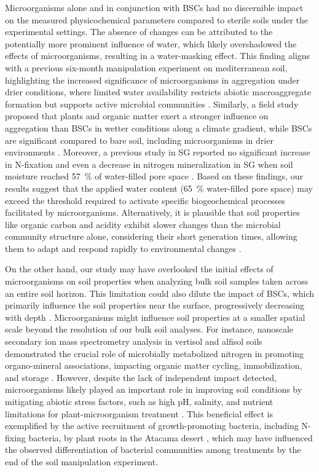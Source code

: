 Microorganisms alone and in conjunction with BSCs had no discernible impact on the measured physicochemical parameters compared to sterile soils under the experimental settings. The absence of changes can be attributed to the potentially more prominent influence of water, which likely overshadowed the effects of microorganisms, resulting in a water-masking effect. This finding aligns with a previous six-month manipulation experiment on mediterranean soil, highlighting the increased significance of microorganisms in aggregation under drier conditions, where limited water availability restricts abiotic macroaggregate formation but supports active microbial communities \citep{Blankinship2016}. Similarly, a field study proposed that plants and organic matter exert a stronger influence on aggregation than BSCs in wetter conditions along a climate gradient, while BSCs are significant compared to bare soil, including microorganisms in drier environments \citep{RiverasMunoz2022}. Moreover, a previous study in SG reported no significant increase in N-fixation and even a decrease in nitrogen mineralization in SG when soil moisture reached \SI{57}{\percent} of water-filled pore space \citep{Seuss2022}. Based on these findings, our results suggest that the applied water content (\SI{65}{\percent} water-filled pore space) may exceed the threshold required to activate specific biogeochemical processes facilitated by microorganisms. Alternatively, it is plausible that soil properties like organic carbon and acidity exhibit slower changes than the microbial community structure alone, considering their short generation times, allowing them to adapt and respond rapidly to environmental changes \citep{Placella2012}.

On the other hand, our study may have overlooked the initial effects of microorganisms on soil properties when analyzing bulk soil samples taken across an entire soil horizon. This limitation could also dilute the impact of BSCs, which primarily influence the soil properties near the surface, progressively decreasing with depth \citep{Miralles2020}. Microorganisms might influence soil properties at a smaller spatial scale beyond the resolution of our bulk soil analyses. For instance, nanoscale secondary ion mass spectrometry analysis in vertisol and alfisol soils demonstrated the crucial role of microbially metabolized nitrogen in promoting organo-mineral associations, impacting organic matter cycling, immobilization, and storage \citep{Kopittke2018}. However, despite the lack of independent impact detected, microorganisms likely played an important role in improving soil conditions by mitigating abiotic stress factors, such as high pH, salinity, and nutrient limitations for plant-microorganism treatment \citep{Etesami2017}. This beneficial effect is exemplified by the active recruitment of growth-promoting bacteria, including N-fixing bacteria, by plant roots in the Atacama desert \citep{Eshel2021}, which may have influenced the observed differentiation of bacterial communities among treatments by the end of the soil manipulation experiment.

